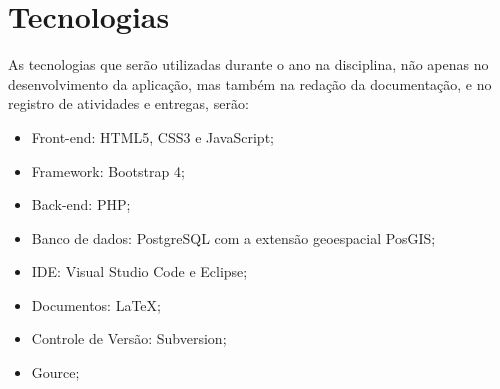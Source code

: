 \chapter{Tecnologias}
As tecnologias que serão utilizadas durante o ano na disciplina, não apenas no desenvolvimento da aplicação, mas também na redação da documentação, e no registro de atividades e entregas, serão:
\begin{itemize}
\item Front-end: HTML5, CSS3 e JavaScript;
\item Framework: Bootstrap 4;
\item Back-end: PHP;
\item Banco de dados: PostgreSQL com a extensão geoespacial PosGIS;
\item IDE: Visual Studio Code e Eclipse;
\item Documentos: \LaTeX;
\item Controle de Versão: Subversion;
\item Gource;
\end{itemize}


